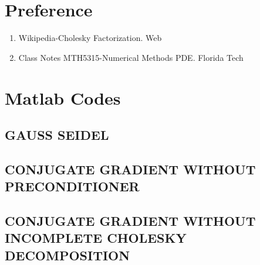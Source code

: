 \documentclass{article}
\begin{document}
\newpage
\section{Preference}

\begin{enumerate}
	\item Wikipedia-Cholesky Factorization. Web
	\item Class Notes MTH5315-Numerical Methods PDE. Florida Tech 
\end{enumerate}

\newpage

\section{Matlab Codes}
\subsection{GAUSS SEIDEL}


\newpage

\subsection{CONJUGATE GRADIENT WITHOUT PRECONDITIONER}



\newpage

\subsection{CONJUGATE GRADIENT WITHOUT INCOMPLETE CHOLESKY DECOMPOSITION}


\end{document}
